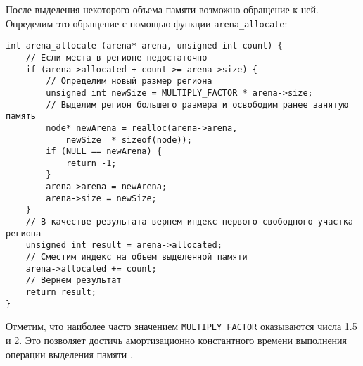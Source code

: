 После выделения некоторого объема памяти возможно обращение к ней. Определим
это обращение с помощью функции \verb|arena_allocate|:

\begin{verbatim} 
int arena_allocate (arena* arena, unsigned int count) {
    // Если места в регионе недостаточно
    if (arena->allocated + count >= arena->size) {
        // Определим новый размер региона
        unsigned int newSize = MULTIPLY_FACTOR * arena->size;
        // Выделим регион большего размера и освободим ранее занятую память
        node* newArena = realloc(arena->arena, 
            newSize  * sizeof(node));
        if (NULL == newArena) {
            return -1;
        }
        arena->arena = newArena;
        arena->size = newSize;
    }
    // В качестве результата вернем индекс первого свободного участка региона
    unsigned int result = arena->allocated;
    // Сместим индекс на объем выделенной памяти
    arena->allocated += count;
    // Вернем результат
    return result;
}
\end{verbatim}

Отметим, что наиболее часто значением \verb|MULTIPLY_FACTOR| оказываются числа
1.5 и 2. Это позволяет достичь амортизационно константного времени выполнения
операции выделения памяти \cite{facebook}.